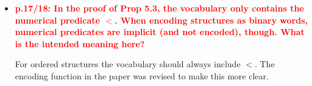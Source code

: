 \documentclass[a4paper]{article}
\newcommand{\red}[1]{{\bf\textcolor{red}{#1}}}
\begin{document}
\begin{itemize}
	\item \red{p.17/18: In the proof of Prop 5.3, the vocabulary only contains the numerical predicate $<$. When encoding structures as binary words, numerical predicates are implicit (and not encoded), though. What is the intended meaning here?}
	
	For ordered structures the vocabulary should always include $<$. The encoding function in the paper was revised to make this more clear.
	

\end{itemize}
\end{document}
